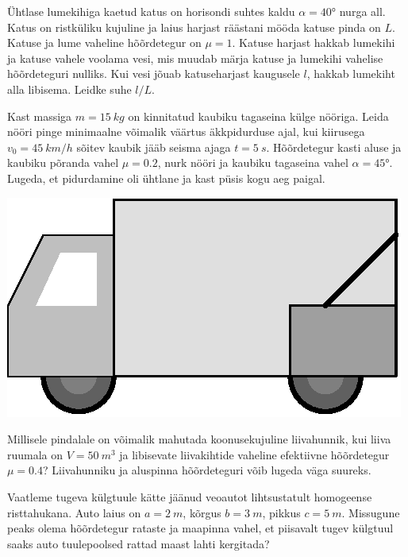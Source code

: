 \documentclass[10pt, twoside]{article}
\begin{document}
{%

Ühtlase lumekihiga kaetud katus on horisondi suhtes kaldu $\alpha = \ang{40}$ nurga all. Katus on ristküliku kujuline ja laius harjast räästani mööda katuse pinda on $L$. Katuse ja lume vaheline hõõrdetegur on $\mu = \num{1}$. Katuse harjast hakkab lumekihi ja katuse vahele voolama vesi, mis muudab märja katuse ja lumekihi vahelise hõõrdeteguri nulliks. Kui vesi jõuab katuseharjast kaugusele $l$, hakkab lumekiht alla libisema. Leidke suhe $l/L$.
\probend
\bigskip


Kast massiga $m=\SI{15}{kg}$ on kinnitatud kaubiku tagaseina külge nööriga. Leida nööri pinge minimaalne võimalik väärtus äkkpidurduse ajal, kui kiirusega $v_0=\SI{45}{km/h}$ sõitev kaubik jääb seisma ajaga $t=\SI{5}{s}$. Hõõrdetegur kasti aluse ja kaubiku põranda vahel $\mu=\num{0,2}$, nurk nööri ja kaubiku tagaseina vahel $\alpha=\ang{45}$. Lugeda, et pidurdamine oli ühtlane ja kast püsis kogu aeg paigal.
\begin{center}
	\includegraphics[width=0.5\linewidth]{2009-v3g-02-G_kast_kaubikus.eps}
\end{center}
\probend
\bigskip


Millisele pindalale on võimalik mahutada koonusekujuline liivahunnik, kui liiva ruumala on $V=\SI{50}{m^{3}}$ ja libisevate liivakihtide vaheline efektiivne hõõrdetegur $\mu=\num{0.4}$? Liivahunniku ja aluspinna hõõrdeteguri võib lugeda väga suureks.
\probend
\bigskip


Vaatleme tugeva külgtuule kätte jäänud veoautot lihtsustatult homogeense risttahukana. Auto laius on $a = \SI{2}{m}$, kõrgus $b = \SI{3}{m}$, pikkus
$c = \SI{5}{m}$. Missugune peaks olema hõõrdetegur rataste ja maapinna vahel, et piisavalt tugev külgtuul saaks auto tuulepoolsed rattad maast lahti kergitada?
\probend
\newpage

}
\end{document}
